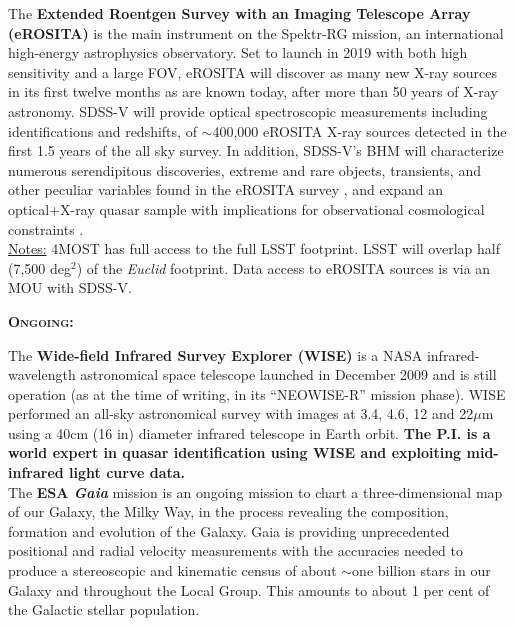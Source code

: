 \begin{framed}
The {\bf Extended Roentgen Survey with an Imaging Telescope Array
(eROSITA)} is the main instrument on the Spektr-RG mission, an
international high-energy astrophysics observatory.  Set to launch in
2019 with both high sensitivity and a large FOV, eROSITA will discover
as many new X-ray sources in its first twelve months as are known
today, after more than 50 years of X-ray astronomy.  SDSS-V will
provide optical spectroscopic measurements including identifications
and redshifts, of $\sim$400,000 eROSITA X-ray sources detected in the
first 1.5 years of the all sky survey.  In addition, SDSS-V's BHM will
characterize numerous serendipitous discoveries, extreme and rare
objects, transients, and other peculiar variables found in the eROSITA
survey \citep{Merloni2012}, and expand an optical+X-ray quasar sample
with implications for observational cosmological constraints
\citep[e.g.][]{Risaliti_Lusso2015}.\\

\underline{Notes:} 4MOST has full access to the full LSST
footprint. LSST will overlap half (7,500 deg$^2$) of the {\it Euclid}
footprint. Data access to eROSITA sources is via an MOU with  
SDSS-V. \\

\hrulefill 

\noindent
\textbf{\textsc{Ongoing:}} 

The {\bf Wide-field Infrared Survey Explorer (WISE)} is a NASA
infrared-wavelength astronomical space telescope launched in December
2009 and is still operation (as at the time of writing, in its
``NEOWISE-R'' mission phase). WISE performed an all-sky astronomical
survey with images at 3.4, 4.6, 12 and 22$\mu$m using a 40cm (16 in)
diameter infrared telescope in Earth orbit.  {\bf The P.I. is a world
expert in quasar identification using WISE \citep[e.g., ][]{Ross2012,
Ross2015, Timlin2016, Timlin2018} and exploiting mid-infrared light
curve data.} \\

The \textbf{ESA {\it Gaia}} mission is an ongoing mission to chart a
three-dimensional map of our Galaxy, the Milky Way, in the process
revealing the composition, formation and evolution of the Galaxy. Gaia
is providing unprecedented positional and radial velocity measurements
with the accuracies needed to produce a stereoscopic and kinematic
census of about $\sim$one billion stars in our Galaxy and throughout
the Local Group. This amounts to about 1 per cent of the Galactic
stellar population.
\end{framed}
